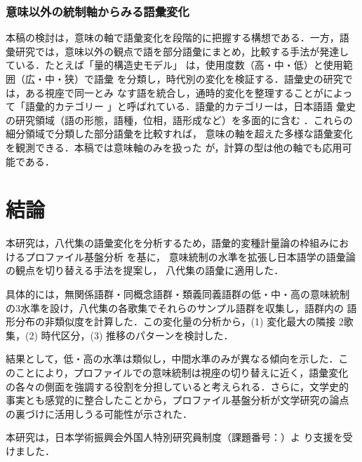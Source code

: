 \documentclass[submit]{ipsj}
\begin{document}
\subsubsection{意味以外の統制軸からみる語彙変化\label{orgf72f215}}
\label{sec:org21ae2f5}
本稿の検討は，意味の軸で語彙変化を段階的に把握する構想である．一方，語
彙研究では，意味以外の観点で語を部分語彙にまとめ，比較する手法が発達し
ている．たとえば「量的構造史モデル」\cite{ito2009Keiryo,ito2008Goi} は，使用度数（高・中・低）と使用範囲（広・中・狭）で語彙
を分類し，時代別の変化を検証する．語彙史の研究では，ある視座で同一とみ
なす語を統合し，通時的変化を整理することがによって「語彙的カテゴリー
\cite{abe2009Goia}」と呼ばれている．語彙的カテゴリーは，日本語語
彙史の研究領域（語の形態，語種，位相，語形成など）を多面的に含む
\cite{abe2009Goia}．これらの細分領域で分類した部分語彙を比較すれば，
意味の軸を超えた多様な語彙変化を観測できる．本稿では意味軸のみを扱った
が，計算の型は他の軸でも応用可能である．
\section{結論\label{orgd227a8c}}
\label{sec:org115a5a6}
本研究は，八代集の語彙変化を分析するため，語彙的変種計量論の枠組みにお
けるプロファイル基盤分析 \cite{Speelman2003Profilebased} を基に，
意味統制の水準を拡張し日本語学の語彙論の観点を切り替える手法を提案し，
八代集の語彙に適用した．

具体的には，無関係語群・同概念語群・類義同義語群の低・中・高の意味統制
の3水準を設け，八代集の各歌集でそれらのサンプル語群を収集し，語群内の
語形分布の非類似度を計算した．この変化量の分析から，(1) 変化最大の隣接
2歌集，(2) 時代区分，(3) 推移のパターンを検討した．

結果として，低・高の水準は類似し，中間水準のみが異なる傾向を示した．こ
のことにより，プロファイルでの意味統制は視座の切り替えに近く，語彙変化
の各々の側面を強調する役割を分担していると考えられる．さらに，文学史的
事実とも感覚的に整合したことから，プロファイル基盤分析が文学研究の論点
の裏づけに活用しうる可能性が示された．
\begin{acknowledgment}
本研究は，日本学術振興会外国人特別研究員制度（課題番号：）よ
り支援を受けました．
\end{acknowledgment}


\end{document}
